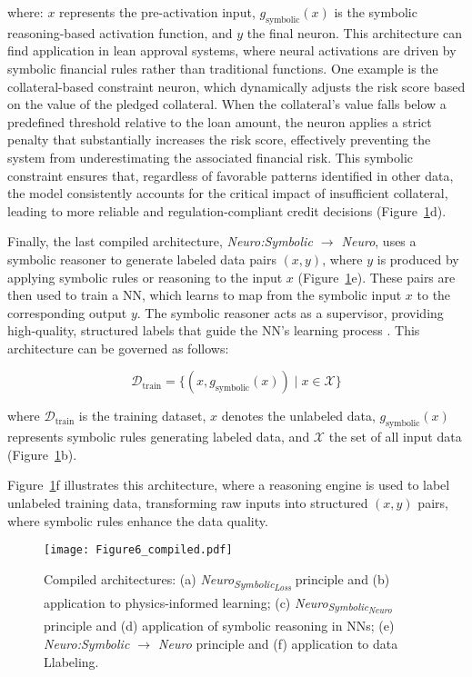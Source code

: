 \documentclass[12pt]{article}
\begin{document}
\noindent where: $x$ represents the pre-activation input, $g_\text{symbolic}(x)$ is the symbolic reasoning-based activation function, and $y$ the final neuron. This architecture can find application in lean approval systems, where neural activations are driven by symbolic financial rules rather than traditional functions. One example is the collateral-based constraint neuron, which dynamically adjusts the risk score based on the value of the pledged collateral. When the collateral’s value falls below a predefined threshold relative to the loan amount, the neuron applies a strict penalty that substantially increases the risk score, effectively preventing the system from underestimating the associated financial risk. This symbolic constraint ensures that, regardless of favorable patterns identified in other data, the model consistently accounts for the critical impact of insufficient collateral, leading to more reliable and regulation-compliant credit decisions (Figure~\ref{fig:compiled}d).

Finally, the last compiled architecture, \textit{Neuro:Symbolic $\to$ Neuro}, uses a  symbolic reasoner to generate labeled data pairs \((x, y)\), where \(y\) is produced by applying symbolic rules or reasoning to the input \(x\) (Figure~\ref{fig:compiled}e). These pairs are then used to train a NN, which learns to map from the symbolic input \(x\) to the corresponding output \(y\). The symbolic reasoner acts as a supervisor, providing high-quality, structured labels that guide the NN’s learning process \cite{riegel2020logical}. This architecture can be governed as follows:

\begin{equation}
 \mathcal{D}_\text{train} = \{(x, g_\text{symbolic}(x)) \mid x \in \mathcal{X}\}   
\end{equation}

\noindent where $\mathcal{D}_\text{train}$ is the training dataset, $x$ denotes the unlabeled data, $g_\text{symbolic}(x)$ represents symbolic rules generating labeled data, and $\mathcal{X}$ the set of all input data (Figure~\ref{fig:compiled}b).

Figure~\ref{fig:compiled}f illustrates this architecture, where a reasoning engine is used to label unlabeled training data, transforming raw inputs into structured $(x,y)$ pairs, where symbolic rules enhance the data quality.

\begin{figure}[!h]
    \centering
    \texttt{[image: Figure6\_compiled.pdf]}
    \caption{Compiled architectures: (a) \textit{Neuro\textsubscript{Symbolic\textsubscript{Loss}}} principle and (b) application to physics-informed learning; (c) \textit{Neuro\textsubscript{Symbolic\textsubscript{Neuro}}} principle and (d) application of symbolic reasoning in NNs; (e) \textit{Neuro:Symbolic $\rightarrow$ Neuro} principle and (f) application to data Llabeling.}
    \label{fig:compiled}
\end{figure}
\end{document}

